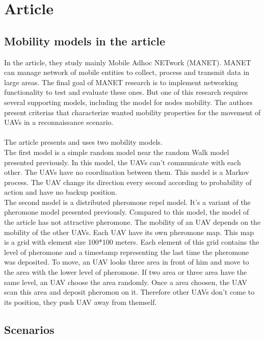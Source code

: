 \part{Article}

\setcounter{chapter}{0}

\chapter{Mobility models in the article}

In the article, they study mainly Mobile Adhoc NETwork (MANET). MANET can manage network of mobile entities to collect, process and transmit data in large areas. The final goal of MANET research is to implement networking functionality to test and evaluate these ones. But one of this research requires several supporting models, including the model for nodes mobility. The authors present criterias that characterize wanted mobility properties for the movement of UAVs in a reconnaissance scenario. \\\\

The article presents and uses two mobility models.\\
The first model is a simple random model near the random Walk model presented previously. In this model, the UAVs can't communicate with each other. The UAVs have no coordination between them. This model is a Markov process. The UAV change its direction every second according to probability of action and have no backup position.\\

The second model is a distributed pheromone repel model. It's a variant of the pheromone model presented previously. Compared to this model, the model of the article has not attractive pheromone. The mobility of an UAV depends on the mobility of the other UAVs. Each UAV have its own pheromone map. This map is a grid with element size 100*100 meters. Each element of this grid contains the level of pheromone and a timestamp representing the last time the pheromone was deposited. To move, an UAV looks three area in front of him and move to the area with the lower level of pheromone. If two area or three area have the same level, an UAV choose the area randomly. Once a area choosen, the UAV scan this area and deposit pheromon on it. Therefore other UAVs don't come to its position, they push UAV away from themself.

\chapter{Scenarios}

